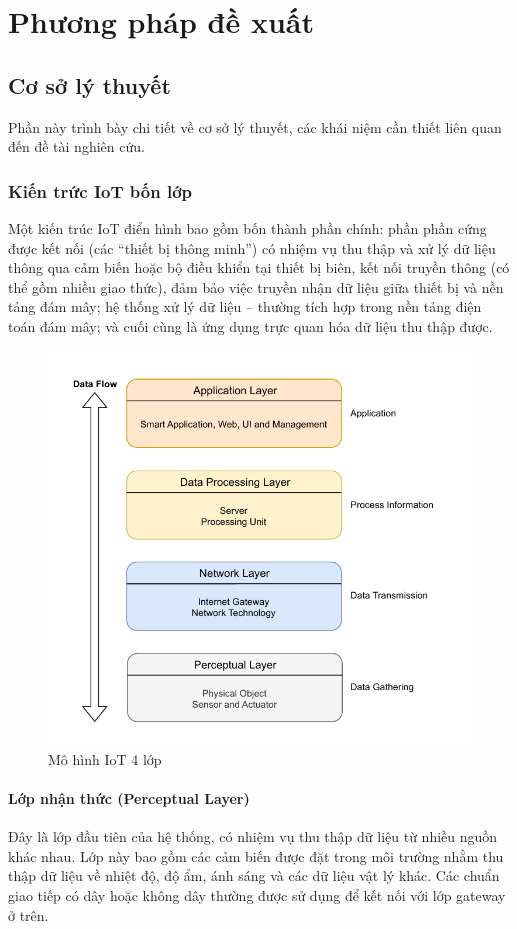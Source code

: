 \chapter{Phương pháp đề xuất}
\label{Chapter3}

\section{Cơ sở lý thuyết}
Phần này trình bày chi tiết về cơ sở lý thuyết, các khái niệm cần thiết liên quan đến đề tài nghiên cứu.
\subsection{Kiến trức IoT bốn lớp}
\label{sec:4layer}
Một kiến trúc IoT điển hình bao gồm bốn thành phần chính: phần phần cứng được kết nối (các “thiết bị thông minh”) có nhiệm vụ thu thập và xử lý dữ liệu thông qua cảm biến hoặc bộ điều khiển tại thiết bị biên, kết nối truyền thông (có thể gồm nhiều giao thức), đảm bảo việc truyền nhận dữ liệu giữa thiết bị và nền tảng đám mây; hệ thống xử lý dữ liệu – thường tích hợp trong nền tảng điện toán đám mây; và cuối cùng là ứng dụng trực quan hóa dữ liệu thu thập được.
\begin{figure}[h]
    \centering
    \includegraphics[width=0.75\linewidth]{images/4layer.pdf}
    \caption{Mô hình IoT 4 lớp}
    \label{fig:4layer}
\end{figure}
\subsubsection{Lớp nhận thức (Perceptual Layer)}
Đây là lớp đầu tiên của hệ thống, có nhiệm vụ thu thập dữ liệu từ nhiều nguồn khác nhau. Lớp này bao gồm các cảm biến được đặt trong môi trường nhằm thu thập dữ liệu về nhiệt độ, độ ẩm, ánh sáng và các dữ liệu vật lý khác. Các chuẩn giao tiếp có dây hoặc không dây thường được sử dụng để kết nối với lớp gateway ở trên.
